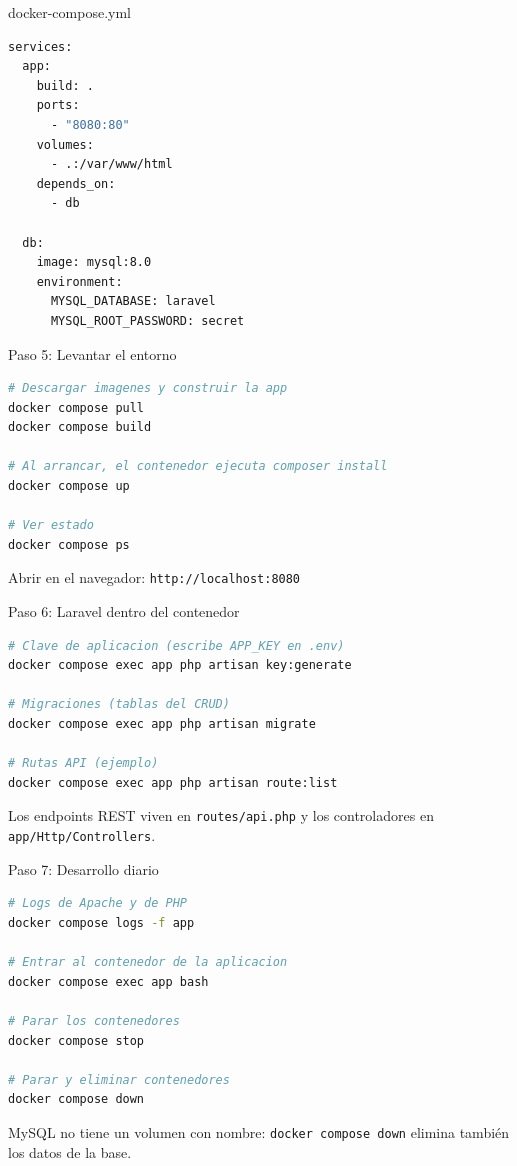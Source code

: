 \documentclass[aspectratio=169,10pt]{beamer}
\begin{document}
\begin{frame}[fragile]{docker-compose.yml}
\begin{lstlisting}[language=bash]
services:
  app:
    build: .
    ports:
      - "8080:80"
    volumes:
      - .:/var/www/html
    depends_on:
      - db

  db:
    image: mysql:8.0
    environment:
      MYSQL_DATABASE: laravel
      MYSQL_ROOT_PASSWORD: secret
\end{lstlisting}
\end{frame}

\begin{frame}[fragile]{Paso 5: Levantar el entorno}
\begin{lstlisting}[language=bash]
# Descargar imagenes y construir la app
docker compose pull
docker compose build

# Al arrancar, el contenedor ejecuta composer install
docker compose up

# Ver estado
docker compose ps
\end{lstlisting}
  Abrir en el navegador: \texttt{http://localhost:8080}
\end{frame}

\begin{frame}[fragile]{Paso 6: Laravel dentro del contenedor}
\begin{lstlisting}[language=bash]
# Clave de aplicacion (escribe APP_KEY en .env)
docker compose exec app php artisan key:generate

# Migraciones (tablas del CRUD)
docker compose exec app php artisan migrate

# Rutas API (ejemplo)
docker compose exec app php artisan route:list
\end{lstlisting}
  Los endpoints REST viven en \texttt{routes/api.php} y los controladores en \texttt{app/Http/Controllers}.
\end{frame}

\begin{frame}[fragile]{Paso 7: Desarrollo diario}
\begin{lstlisting}[language=bash]
# Logs de Apache y de PHP
docker compose logs -f app

# Entrar al contenedor de la aplicacion
docker compose exec app bash

# Parar los contenedores
docker compose stop

# Parar y eliminar contenedores
docker compose down
\end{lstlisting}
  \vspace{0.3em}
  \small MySQL no tiene un volumen con nombre: \texttt{docker compose down} elimina también los datos de la base.
\end{frame}
\end{document}
